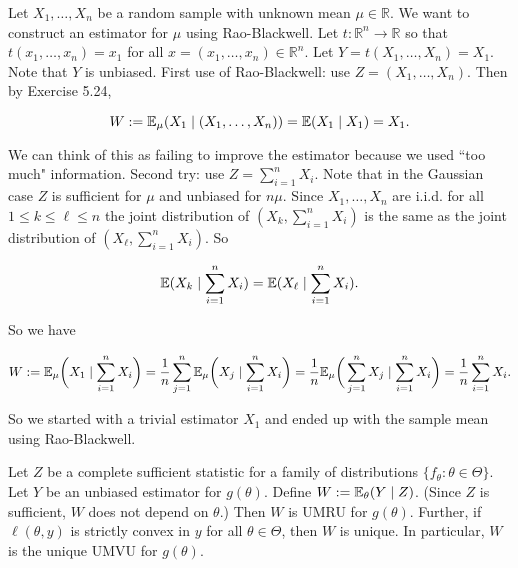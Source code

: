 \begin{example} Let \(X_1, \ldots, X_n\) be a random sample with unknown mean \(\mu \in \mathbb{R}\). We want to construct an estimator for \(\mu\) using Rao-Blackwell. Let \(t: \mathbb{R}^n \to \mathbb{R}\) so that \(t(x_1, \ldots, x_n) = x_1\) for all \(x = (x_1, \ldots, x_n) \in \mathbb{R}^n\).  Let \(Y = t(X_1, \ldots, X_n) = X_1\). Note that \(Y\) is unbiased. First use of Rao-Blackwell: use \(Z = (X_1, \ldots, X_n)\). Then by Exercise 5.24,

\[
W:= \E_\mu(X_1 \mid(X_1, \ldots, X_n)) = \E(X_1 \mid X_1) = X_1.
\]

We can think of this as failing to improve the estimator because we used ``too much" information. Second try: use \(Z = \sum_{i=1}^n X_i \). Note that in the Gaussian case \(Z\) is sufficient for \(\mu\) and unbiased for \(n \mu\). Since \(X_1, \ldots, X_n\) are i.i.d. for all \(1 \leq k \leq \ell \leq n\) the joint distribution of \((X_k, \sum_{i=1}^n X_i)\) is the same as the joint distribution of \((X_\ell, \sum_{i=1}^n X_i)\). So 

\[
\E(X_k \mid \sum_{i=1}^n X_i) = \E(X_\ell \mid \sum_{i=1}^n X_i).
\]

So we have

\[
W:= \E_\mu \bigg(X_1 \mid \sum_{i=1}^n X_i \bigg) = \frac{1}{n}\sum_{j=1}^n \E_\mu \bigg(X_j \mid \sum_{i=1}^n X_i \bigg) = \frac{1}{n} \E_\mu \bigg(\sum_{j=1}^n X_j \mid \sum_{i=1}^n X_i \bigg) = \frac{1}{n} \sum_{i=1}^n X_i.
\]

So we started with a trivial estimator \(X_1\) and ended up with the sample mean using Rao-Blackwell.

\end{example}

\begin{theorem}\label{mathstats.lehmann.scheffe} Let \(Z\) be a complete sufficient statistic for a family of distributions \(\{f_\theta: \theta \in \Theta\}\). Let \(Y\) be an unbiased estimator for \(g(\theta)\). Define \(W:= \E_\theta(Y \mid Z)\). (Since \(Z\) is sufficient, \(W\) does not depend on \(\theta\).) Then \(W\) is UMRU for \(g(\theta)\). Further, if \(\ell(\theta, y)\) is strictly convex in \(y\) for all \(\theta \in \Theta\), then \(W\) is unique. In particular, \(W\) is the unique UMVU for \(g(\theta)\).

\end{theorem}

